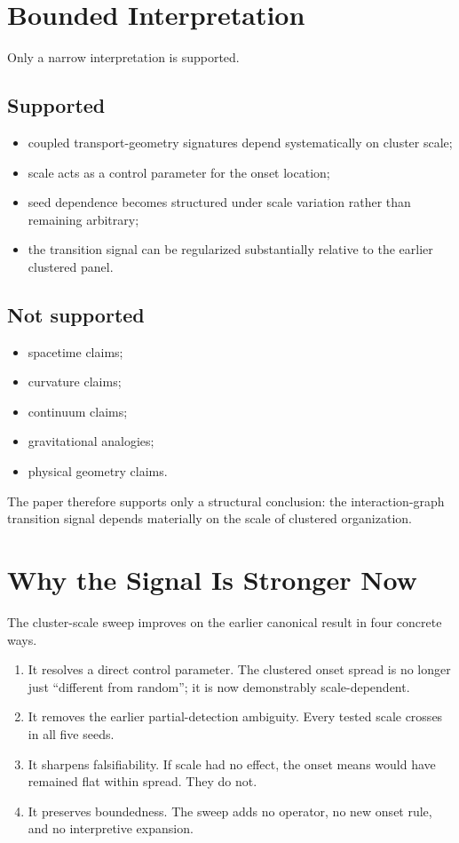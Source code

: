 \documentclass[11pt]{article}
\begin{document}
\section{Bounded Interpretation}

Only a narrow interpretation is supported.

\subsection*{Supported}

\begin{itemize}
\item coupled transport-geometry signatures depend systematically on cluster scale;
\item scale acts as a control parameter for the onset location;
\item seed dependence becomes structured under scale variation rather than remaining arbitrary;
\item the transition signal can be regularized substantially relative to the earlier clustered panel.
\end{itemize}

\subsection*{Not supported}

\begin{itemize}
\item spacetime claims;
\item curvature claims;
\item continuum claims;
\item gravitational analogies;
\item physical geometry claims.
\end{itemize}

The paper therefore supports only a structural conclusion: the interaction-graph transition signal depends materially on the scale of clustered organization.

\section{Why the Signal Is Stronger Now}

The cluster-scale sweep improves on the earlier canonical result in four concrete ways.

\begin{enumerate}
\item It resolves a direct control parameter. The clustered onset spread is no longer just ``different from random''; it is now demonstrably scale-dependent.
\item It removes the earlier partial-detection ambiguity. Every tested scale crosses in all five seeds.
\item It sharpens falsifiability. If scale had no effect, the onset means would have remained flat within spread. They do not.
\item It preserves boundedness. The sweep adds no operator, no new onset rule, and no interpretive expansion.
\end{enumerate}
\end{document}
